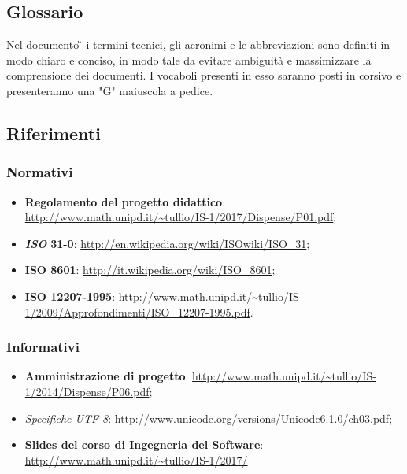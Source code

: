\subsection{Glossario}
Nel documento \G{} i termini tecnici, gli acronimi e le abbreviazioni sono definiti in modo chiaro e conciso, in modo tale da evitare ambiguità e massimizzare la comprensione dei documenti.
\newline I vocaboli presenti in esso saranno posti in corsivo e presenteranno una "G" maiuscola a pedice.
\subsection{Riferimenti}
\subsubsection{Normativi}
\begin{itemize}
	\item
	\textbf{Regolamento del progetto didattico}:
	\url{http://www.math.unipd.it/~tullio/IS-1/2017/Dispense/P01.pdf};
	\item
	\textbf{\textit{ISO}} \textbf{31-0}: \url{http://en.wikipedia.org/wiki/ISOwiki/ISO\_31};
	\item
	\textbf{ISO 8601}: \url{http://it.wikipedia.org/wiki/ISO\_8601};
	\item
	\textbf{ISO 12207-1995}: \url{http://www.math.unipd.it/~tullio/IS-1/2009/Approfondimenti/ISO\_12207-1995.pdf}.
\end{itemize}
\subsubsection{Informativi}
\begin{itemize}
	\item \textbf{Amministrazione di progetto}: \url{http://www.math.unipd.it/~tullio/IS-1/2014/Dispense/P06.pdf};
	\item \textit{Specifiche \textit{UTF-8}}: \url{http://www.unicode.org/versions/Unicode6.1.0/ch03.pdf};
	\item \textbf{Slides del corso di Ingegneria del Software}:
	\url{http://www.math.unipd.it/~tullio/IS-1/2017/}
\end{itemize}
